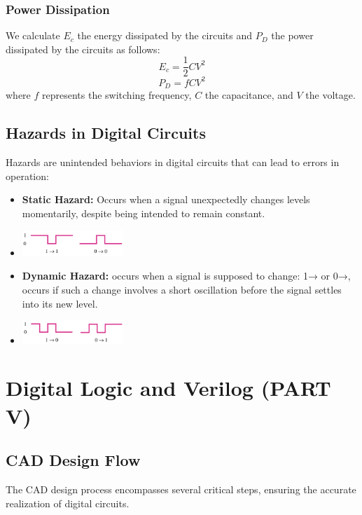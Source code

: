 \documentclass[12pt,openany, tikz,border=10pt]{book}
\begin{document}
\subsection{Power Dissipation}

We calculate $E_c$ the energy dissipated by the circuits and $P_D$ the power dissipated by the circuits as follows:
\begin{equation}
E_c = \frac{1}{2}CV^2
\end{equation}
\begin{equation}
P_D = fCV^2
\end{equation}
where $f$ represents the switching frequency, $C$ the capacitance, and $V$ the voltage. 

\section{Hazards in Digital Circuits}

Hazards are unintended behaviors in digital circuits that can lead to errors in operation:
\begin{itemize}
    \item[] \textbf{Static Hazard:} Occurs when a signal unexpectedly changes levels momentarily, despite being intended to remain constant.
    \item[] 
        \centering
        \includegraphics[width=0.3\textwidth]{circuits/9.5.png}
       
        
    \item[] \textbf{Dynamic Hazard:} occurs
    when a signal is supposed to
    change: 1\;→ or 0\;→, occurs if such a change
    involves a short oscillation before
    the signal settles into its new level.
    \item[] 
        \centering
        \includegraphics[width=0.3\textwidth]{circuits/9.5_1.png}
\end{itemize}

\chapter{Digital Logic and Verilog (PART V)}

\section{CAD Design Flow}
The CAD design process encompasses several critical steps, ensuring the accurate realization of digital circuits. 
\end{document}
